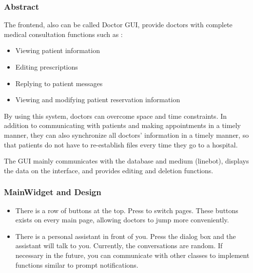 \documentclass{article}
\begin{document}
\subsubsection*{Abstract}
The frontend, also can be called Doctor GUI, provide doctors with complete medical consultation functions such as :

\begin{itemize}
    \item Viewing patient information
    \item Editing prescriptions
    \item Replying to patient messages
    \item Viewing and modifying patient reservation information
\end{itemize}

By using this system, doctors can overcome space and 
time constraints. In addition to communicating with 
patients and making appointments in a timely manner, 
they can also synchronize all doctors' information 
in a timely manner, so that patients do not have to 
re-establish files every time they go to a hospital.

The GUI mainly communicates with the database and 
medium (linebot), displays the data on the interface, 
and provides editing and deletion functions. 


\subsubsection*{MainWidget and Design}
\begin{itemize}
    \item There is a row of buttons at the top. Press to switch pages. These buttons exists on every main page, allowing doctors to jump more conveniently.
    \item There is a personal assistant in front of you. Press the dialog box and the assistant will talk to you. Currently, the conversations are random. If necessary in the future, you can communicate with other classes to implement functions similar to prompt notifications.
\end{itemize}
\end{document}
